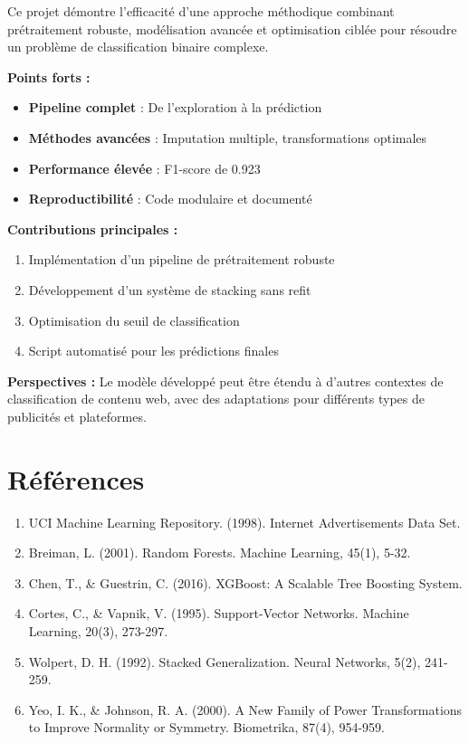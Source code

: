 \documentclass[12pt,a4paper]{article}
\begin{document}
Ce projet démontre l'efficacité d'une approche méthodique combinant prétraitement robuste, modélisation avancée et optimisation ciblée pour résoudre un problème de classification binaire complexe.

\textbf{Points forts :}
\begin{itemize}
    \item \textbf{Pipeline complet} : De l'exploration à la prédiction
    \item \textbf{Méthodes avancées} : Imputation multiple, transformations optimales
    \item \textbf{Performance élevée} : F1-score de 0.923
    \item \textbf{Reproductibilité} : Code modulaire et documenté
\end{itemize}

\textbf{Contributions principales :}
\begin{enumerate}
    \item Implémentation d'un pipeline de prétraitement robuste
    \item Développement d'un système de stacking sans refit
    \item Optimisation du seuil de classification
    \item Script automatisé pour les prédictions finales
\end{enumerate}

\textbf{Perspectives :}
Le modèle développé peut être étendu à d'autres contextes de classification de contenu web, avec des adaptations pour différents types de publicités et plateformes.

\section{Références}

\begin{enumerate}
    \item UCI Machine Learning Repository. (1998). Internet Advertisements Data Set.
    \item Breiman, L. (2001). Random Forests. Machine Learning, 45(1), 5-32.
    \item Chen, T., \& Guestrin, C. (2016). XGBoost: A Scalable Tree Boosting System.
    \item Cortes, C., \& Vapnik, V. (1995). Support-Vector Networks. Machine Learning, 20(3), 273-297.
    \item Wolpert, D. H. (1992). Stacked Generalization. Neural Networks, 5(2), 241-259.
    \item Yeo, I. K., \& Johnson, R. A. (2000). A New Family of Power Transformations to Improve Normality or Symmetry. Biometrika, 87(4), 954-959.
\end{enumerate}
\end{document}
